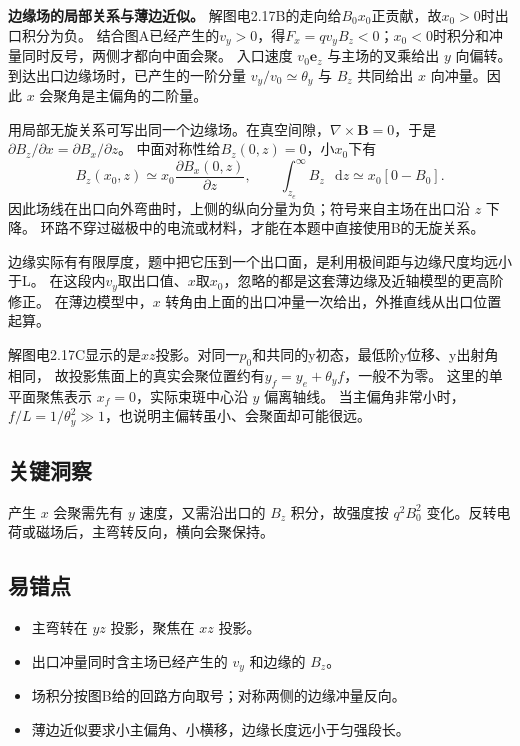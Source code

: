 \documentclass[UTF8,fontset=fandol,a4paper,11pt]{ctexart}
\newcommand{\dd}{\mathop{}\!\mathrm{d}}
\begin{document}
\textbf{边缘场的局部关系与薄边近似。} 解图电2.17B的走向给$B_0x_0$正贡献，故$x_0>0$时出口积分为负。
结合图A已经产生的$v_y>0$，得$F_x=qv_yB_z<0$；$x_0<0$时积分和冲量同时反号，两侧才都向中面会聚。
入口速度 $v_0\boldsymbol e_z$ 与主场的叉乘给出 $y$ 向偏转。到达出口边缘场时，已产生的一阶分量 $v_y/v_0\simeq\theta_y$ 与 $B_z$ 共同给出 $x$ 向冲量。因此 $x$ 会聚角是主偏角的二阶量。

用局部无旋关系可写出同一个边缘场。在真空间隙，$\nabla\times\boldsymbol B=0$，于是
$\partial B_z/\partial x=\partial B_x/\partial z$。
中面对称性给$B_z(0,z)=0$，小$x_0$下有
\[
B_z(x_0,z)\simeq x_0\frac{\partial B_x(0,z)}{\partial z},\qquad
\int_{z_e}^{\infty}B_z\,\dd z\simeq x_0[0-B_0].
\]
因此场线在出口向外弯曲时，上侧的纵向分量为负；符号来自主场在出口沿 $z$ 下降。
环路不穿过磁极中的电流或材料，才能在本题中直接使用B的无旋关系。

边缘实际有有限厚度，题中把它压到一个出口面，是利用极间距与边缘尺度均远小于L。
在这段内$v_y$取出口值、$x$取$x_0$，忽略的都是这套薄边缘及近轴模型的更高阶修正。
在薄边模型中，$x$ 转角由上面的出口冲量一次给出，外推直线从出口位置起算。

解图电2.17C显示的是$xz$投影。对同一$p_0$和共同的y初态，最低阶y位移、y出射角相同，
故投影焦面上的真实会聚位置约有$y_f=y_e+\theta_yf$，一般不为零。
这里的单平面聚焦表示 $x_f=0$，实际束斑中心沿 $y$ 偏离轴线。
当主偏角非常小时，$f/L=1/\theta_y^2\gg1$，也说明主偏转虽小、会聚面却可能很远。




\subsection*{关键洞察}

产生 $x$ 会聚需先有 $y$ 速度，又需沿出口的 $B_z$ 积分，故强度按 $q^2B_0^2$ 变化。反转电荷或磁场后，主弯转反向，横向会聚保持。



\subsection*{易错点}

\begin{itemize}
\item 主弯转在 $yz$ 投影，聚焦在 $xz$ 投影。
\item 出口冲量同时含主场已经产生的 $v_y$ 和边缘的 $B_z$。
\item 场积分按图B给的回路方向取号；对称两侧的边缘冲量反向。
\item 薄边近似要求小主偏角、小横移，边缘长度远小于匀强段长。
\end{itemize}
\end{document}
